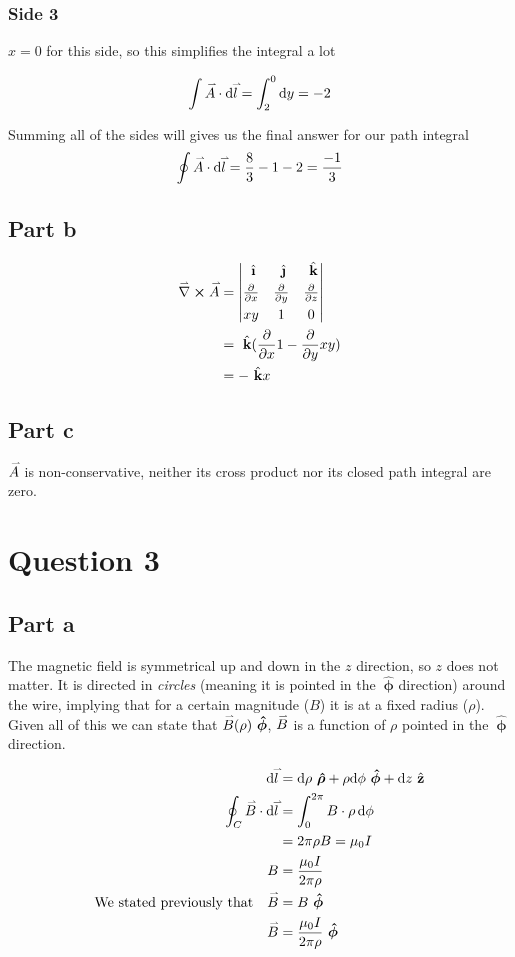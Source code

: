 \documentclass{article}
\newcommand{\ihat}{\ {\hat{\textbf{\i}}}}
\newcommand{\jhat}{\ {\hat{\textbf{\j}}}}
\newcommand{\khat}{\ {\hat{\mathbf{k}}}}
\newcommand{\phat}{\ \boldsymbol{\hat{\phi}}}
\newcommand{\rohat}{\ \boldsymbol{\hat{\rho}}}
\newcommand{\zhat}{\ {\hat{\textbf{z}}}}
\renewcommand{\d}{\text{d}}
\renewcommand{\vec}[1]{\accentset{\rightharpoonup}{#1}}
\newcommand{\del}{\vec{\nabla}}
\newcommand{\dvecdot}[2]{\vec{#1}\cdot\d \vec{#2}}
\renewcommand{\curl}[3]{\begin{vmatrix}
    \vspace{0.1cm}
    \ihat & \jhat & \khat\\
    \vspace{0.1cm}
    \pdv{}{x} & \pdv{}{y} & \pdv{}{z}\\
    {#1} & {#2} & {#3}\\
\end{vmatrix}}
\begin{document}
\subsubsection*{Side 3}
$x = 0$ for this side, so this simplifies the integral a lot

\begin{align*}
    \int \dvecdot{A}{l} = \int_2^0\d y = -2
\end{align*}

Summing all of the sides will gives us the final answer for our path integral
$$\oint \dvecdot{A}{l} = \frac{8}{3} - 1 - 2 = \frac{-1}{3}$$

\subsection*{Part b}

\begin{align*}
    \del \cross \vec{A} &= \curl{xy}{1}{0}\\
    &= \khat(\pdv{}{x}1 - \pdv{}{y}xy) \\
    &= -\khat x
\end{align*}

\subsection*{Part c}
$\vec{A}$ is non-conservative, neither its cross product nor its closed path integral are zero.

\section*{Question 3}
\subsection*{Part a}
The magnetic field is symmetrical up and down in the $z$ direction, so $z$ does not matter.
It is directed in \emph{circles} (meaning it is pointed in the $\phat$ direction) around the wire, 
implying that for a certain magnitude ($B$) it is at a fixed radius ($\rho$). Given all of this we can state
that $\vec{B}(\rho) \phat$, $\vec{B}$ is a function of $\rho$ pointed in the $\phat$ direction. 

\begin{align*}
    \d \vec{l} &= \d\rho\rohat + \rho \d \phi\phat + \d z\zhat\\
    \oint_C \dvecdot{B}{l} &= \int_0^{2\pi} B \cdot \rho\,\d\phi\\
    &= 2\pi\rho B = \mu_0 I\\
    B &= \frac{\mu_0 I}{2\pi\rho}\\
    \text{We stated previously that}\quad \vec{B} &= B\phat \\
    \vec{B} &= \frac{\mu_0 I}{2\pi\rho} \phat
\end{align*}
\end{document}
